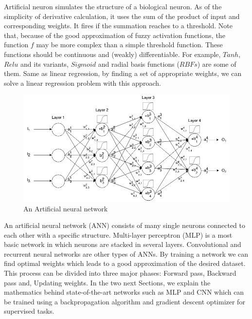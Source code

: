 \documentclass[10pt]{SelfArx} %
\begin{document}
	
	
	Artificial neuron simulates the structure of a biological neuron. As of the simplicity of derivative calculation, it uses the sum of the product of input and corresponding weights. It fires if the summation reaches to a threshold. Note that, because of the good approximation of fuzzy activation functions, the function $f$ may be more complex than a simple threshold function. These functions should be continuous and (weakly) differentiable. For example, $Tanh$, $Relu$ and its variants, $Sigmoid$ and radial basis functions ($RBFs$) are some of them. Same as linear regression, by finding a set of appropriate weights, we can solve a linear regression problem with this approach.
	
	\begin{figure}\centering %
		\includegraphics[width=\linewidth]{img/ann}
		\caption{An Artificial neural network}	
	\end{figure}
	
	An artificial neural network (ANN) consists of many single neurons connected to each other with a specific structure. Multi-layer perceptron (MLP) is a most basic network in which neurons are stacked in several layers. Convolutional and recurrent neural networks are other types of ANNs. By training a network we can find optimal weights which leads to a good approximation of the desired dataset. This process can be divided into three major phases:
	Forward pass, Backward pass and, Updating weights. In the two next Sections, we explain the mathematics behind state-of-the-art networks such as MLP and CNN which can be trained using a backpropagation algorithm and gradient descent optimizer for supervised tasks.
	
\end{document}
